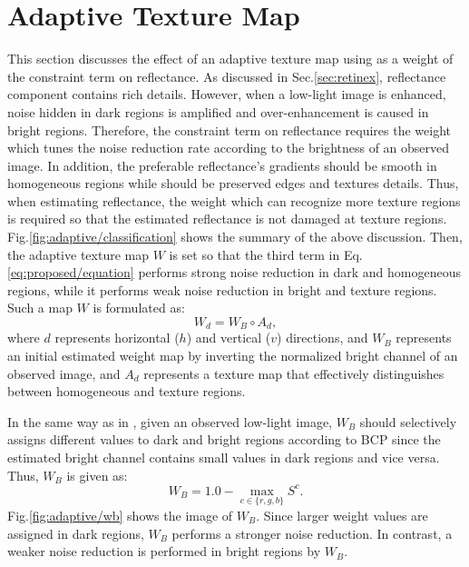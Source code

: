 \section{Adaptive Texture Map} \label{sec:adaptive}
This section discusses the effect of an adaptive texture map using as a weight of the constraint term on reflectance. As discussed in Sec.\ref{sec:retinex}, reflectance component contains rich details. However, when a low-light image is enhanced, noise hidden in dark regions is amplified and over-enhancement is caused in bright regions. Therefore, the constraint term on reflectance requires the weight which tunes the noise reduction rate according to the brightness of an observed image. In addition, the preferable reflectance's gradients should be smooth in homogeneous regions while should be preserved edges and textures details. Thus, when estimating reflectance, the weight which can recognize more texture regions is required so that the estimated reflectance is not damaged at texture regions. Fig.\ref{fig:adaptive/classification} shows the summary of the above discussion. Then, the adaptive texture map $W$ is set so that the third term in Eq.\ref{eq:proposed/equation} performs strong noise reduction in dark and homogeneous regions, while it performs weak noise reduction in bright and texture regions. 
Such a map $W$ is formulated as:
\begin{equation}
W_{d} = W_{B} \circ A_{d}, \label{eq:adaptive_texture}
\end{equation}
where $d$ represents horizontal ($h$) and vertical ($v$) directions, and $W_{B}$ represents an initial estimated weight map by inverting the normalized bright channel of an observed image, and $A_{d}$ represents a texture map that effectively distinguishes between homogeneous and texture regions.\par
In the same way as in \cite{activation}, given an observed low-light image, $W_{B}$ should selectively assigns different values to dark and bright regions according to BCP since the estimated bright channel contains small values in dark regions and vice versa. Thus, $W_{B}$ is given as:
\begin{equation}
W_{B} = 1.0 - \max_{c \in \{r, g, b\}}S^{c}. \label{eq:adaptive/initial_weight}
\end{equation}
Fig.\ref{fig:adaptive/wb} shows the image of $W_{B}$. Since larger weight values are assigned in dark regions, $W_{B}$ performs a stronger noise reduction. In contrast, a weaker noise reduction is performed in bright regions by $W_{B}$.\par
